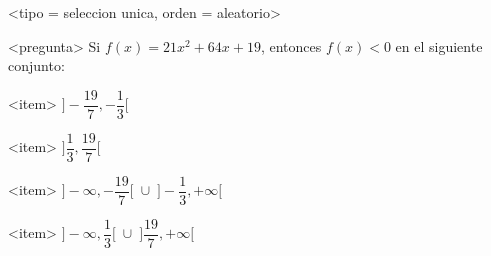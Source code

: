<tipo = seleccion unica, orden = aleatorio>

<pregunta>
Si $f(x) = 21x^2 +64x +19$, entonces $f(x) < 0$ en el siguiente conjunto:


<item>
$\bigg]-\dfrac{19}{7}, -\dfrac{1}{3}\bigg[$

<item>
$\bigg]\dfrac{1}{3}, \dfrac{19}{7}\bigg[$

<item>
$\bigg]{-}\infty, -\dfrac{19}{7}\bigg[\;\cup\; \bigg]-\dfrac{1}{3},+\infty\bigg[$

<item>
$\bigg]{-}\infty, \dfrac{1}{3}\bigg[\;\cup\; \bigg]\dfrac{19}{7},+\infty\bigg[$

 

